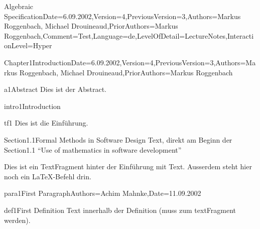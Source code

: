 \documentclass[landscape, slides, light]{mmiss2}
\begin{document}
\begin{Package}{Algebraic
Specification}{Date=6.09.2002,Version=4,PreviousVersion=3,Authors={Markus
Roggenbach, Michael Drouineaud},PriorAuthors={Markus
Roggenbach},Comment=Test,Language=de,LevelOfDetail=LectureNotes,InteractionLevel=Hyper}


\begin{Section}{Chapter1}{Introduction}{Date=6.09.2002,Version=4,PreviousVersion=3,Authors={Markus
Roggenbach, Michael Drouineaud},PriorAuthors={Markus Roggenbach}}
\begin{Abstract}[]{a1}{Abstract}{}
  Dies ist der Abstract.
\end{Abstract}
\begin{Introduction}[]{intro1}{Introduction}{}
\begin{TextFragment}[Latex]{tf1}{}
    Dies ist die Einf\"uhrung.
\end{TextFragment}
\end{Introduction}

\begin{Section}{Section1.1}{Formal Methods in Software Design}{}
  Text, direkt am Beginn der Section1.1 
  ``Use of mathematics in software development''\\
\begin{TextFragment}[]{}{}
  Dies ist ein TextFragment hinter der Einf\"uhrung mit
   Text. Ausserdem steht hier noch
  ein \LaTeX{}-Befehl drin.
\end{TextFragment}

\begin{Paragraph}[]{para1}{First Paragraph}{Authors=Achim Mahnke,Date=11.09.2002}
\begin{Definition}[]{def1}{First Definition}{}
  Text innerhalb der Definition (muss zum textFragment werden).


\end{Definition}
\end{Paragraph}
\end{Section}
\end{Section}
\end{Package}
\end{document}
